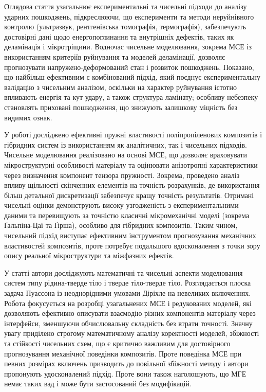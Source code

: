 Оглядова стаття \cite{banhart-2024-article-review} узагальнює експериментальні та чисельні підходи до аналізу ударних
пошкоджень, підкреслюючи, що експерименти та методи неруйнівного контролю (ультразвук, рентгенівська томографія,
термографія), забезпечують достовірні дані щодо енергопоглинання та внутрішніх дефектів, таких як деламінація і
мікротріщини. Водночас чисельне моделювання, зокрема МСЕ із використанням критеріїв руйнування та моделей деламінації,
дозволяє прогнозувати напружено-деформований стан і розвиток пошкоджень. Показано, що найбільш ефективним є комбінований
підхід, який поєднує експериментальну валідацію з чисельним аналізом, оскільки на характер руйнування істотно впливають
енергія та кут удару, а також структура ламінату; особливу небезпеку становлять приховані пошкодження, що знижують
залишкову міцність без видимих ознак.

У роботі \cite{chichane-2023-article-review} досліджено ефективні пружні властивості поліпропіленових композитів і
гібридних систем із використанням як аналітичних, так і чисельних підходів. Чисельне моделювання реалізовано на основі
МСЕ, що дозволяє враховувати мікроструктурні особливості матеріалу та оцінювати анізотропні характеристики через
визначення компонент тензора пружності. Зокрема, проведено аналіз впливу щільності скінченних елементів на точність
розрахунків, де використання більш детальної дискретизації забезпечує кращу точність результатів. Отримані чисельні
оцінки демонструють високу узгодженість з експериментальними даними та перевищують за точністю класичні мікромеханічні
моделі (зокрема Ґальпіна-Цаї та Ґірша), особливо для гібридних композитів. Таким чином, чисельний підхід виступає
ефективним інструментом прогнозування механічних властивостей композитів, проте потребує подальшого вдосконалення з
точки зору опису реальної мікроструктури та міжфазних ефектів.

У статті \cite{boulakia-2024-article-review} автори досліджують математичні та чисельні аспекти моделювання систем типу
рідина-тверде тіло і тверде тіло-тверде тіло. Розглядається плоска задача Пуассона із неоднорідними умовами Діріхле на
невеликих включеннях. Робота фокусується на розробці узагальнених МСЕ і редукованих моделей, які дозволяють ефективно
описувати взаємодію різних компонентів матеріалу через інтерфейси, зменшуючи обчислювальну складність без втрати
точності. Значну увагу приділено строгому математичному аналізу коректності моделей, збіжності та стійкості чисельних
схем, що є критично важливим для достовірного прогнозування механічної поведінки композитів. Проте поведінка МСЕ при 
певних розмірах включень призводить до повільної збіжності методу і автори пропонують удосконалений підхід. Проте вони 
також наголошують, що МГЕ немає таких вад і може бути застосований без модифікацій.

